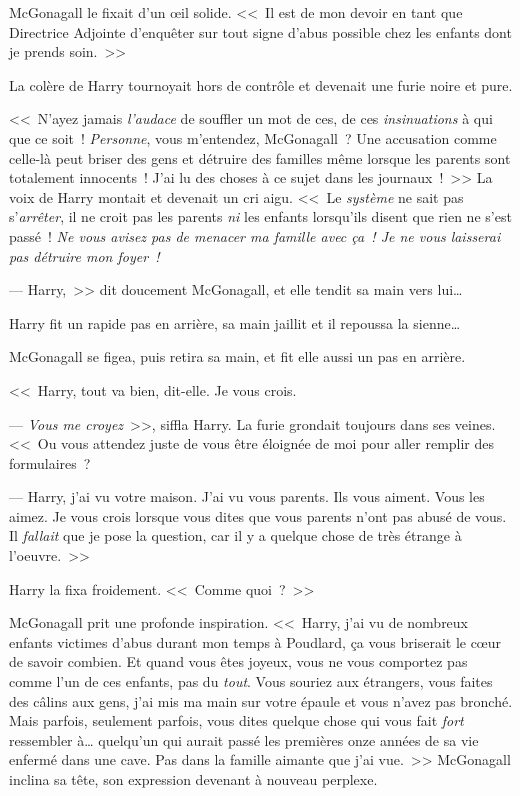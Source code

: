 McGonagall le fixait d'un œil solide. <<~Il est de mon devoir en tant que Directrice Adjointe d'enquêter sur tout signe d'abus possible chez les enfants dont je prends soin.~>>

La colère de Harry tournoyait hors de contrôle et devenait une furie noire et pure.

<<~N'ayez jamais \emph{l'audace} de souffler un mot de ces, de ces \emph{insinuations} à qui que ce soit~! \emph{Personne}, vous m'entendez, McGonagall~? Une accusation comme celle-là peut briser des gens et détruire des familles même lorsque les parents sont totalement innocents~! J'ai lu des choses à ce sujet dans les journaux~!~>> La voix de Harry montait et devenait un cri aigu. <<~Le \emph{système} ne sait pas s'\emph{arrêter}, il ne croit pas les parents \emph{ni} les enfants lorsqu'ils disent que rien ne s'est passé~! \emph{Ne vous avisez pas de menacer ma famille avec ça~! Je ne vous laisserai pas détruire mon foyer~!}

--- Harry,~>> dit doucement McGonagall, et elle tendit sa main vers lui…

Harry fit un rapide pas en arrière, sa main jaillit et il repoussa la sienne…

McGonagall se figea, puis retira sa main, et fit elle aussi un pas en arrière.

<<~Harry, tout va bien, dit-elle. Je vous crois.

--- \emph{Vous me croyez}~>>, siffla Harry. La furie grondait toujours dans ses veines. <<~Ou vous attendez juste de vous être éloignée de moi pour aller remplir des formulaires~?

--- Harry, j'ai vu votre maison. J'ai vu vous parents. Ils vous aiment. Vous les aimez. Je vous crois lorsque vous dites que vous parents n'ont pas abusé de vous. Il \emph{fallait} que je pose la question, car il y a quelque chose de très étrange à l'oeuvre.~>>

Harry la fixa froidement. <<~Comme quoi~?~>>

McGonagall prit une profonde inspiration. <<~Harry, j'ai vu de nombreux enfants victimes d'abus durant mon temps à Poudlard, ça vous briserait le cœur de savoir combien. Et quand vous êtes joyeux, vous ne vous comportez pas comme l'un de ces enfants, pas du \emph{tout}. Vous souriez aux étrangers, vous faites des câlins aux gens, j'ai mis ma main sur votre épaule et vous n'avez pas bronché. Mais parfois, seulement parfois, vous dites quelque chose qui vous fait \emph{fort} ressembler à… quelqu'un qui aurait passé les premières onze années de sa vie enfermé dans une cave. Pas dans la famille aimante que j'ai vue.~>> McGonagall inclina sa tête, son expression devenant à nouveau perplexe.

